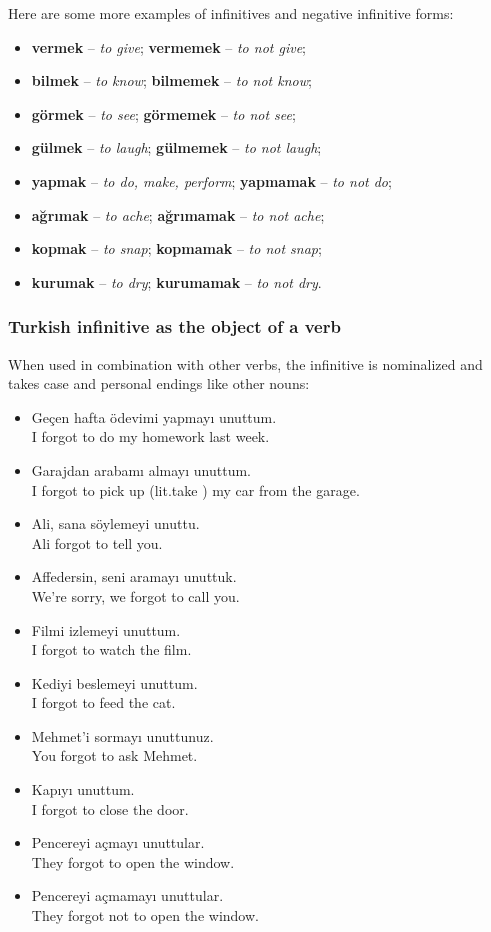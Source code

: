 Here are some more examples of infinitives and negative infinitive forms:
\begin{itemize}
\item \textbf{vermek} -- \emph{to give}; \textbf{vermemek} -- \emph{to not
    give};
\item \textbf{bilmek} -- \emph{to know}; \textbf{bilmemek} -- \emph{to not
    know};
\item \textbf{görmek} -- \emph{to see}; \textbf{görmemek} -- \emph{to not
    see};
\item \textbf{gülmek} -- \emph{to laugh}; \textbf{gülmemek} -- \emph{to not
    laugh};
\item \textbf{yapmak} -- \emph{to do, make, perform}; \textbf{yapmamak} --
  \emph{to not do};
\item \textbf{ağrımak} -- \emph{to ache}; \textbf{ağrımamak} -- \emph{to
    not ache};
\item \textbf{kopmak} -- \emph{to snap}; \textbf{kopmamak} -- \emph{to not
    snap};
\item \textbf{kurumak} -- \emph{to dry}; \textbf{kurumamak} -- \emph{to not
  dry}.
\end{itemize}

\subsubsection{Turkish infinitive as the object of a verb}
When used in combination with other verbs, the infinitive is nominalized
and takes case and personal endings like other nouns:

\begin{itemize}
\item Geçen hafta ödevimi yapmayı unuttum.\\
  I forgot to do my homework last week.
\item Garajdan arabamı almayı unuttum.\\
  I forgot to pick up (lit.\@ take ) my car from the garage.
\item Ali, sana söylemeyi unuttu.\\
  Ali forgot to tell you.
\item Affedersin, seni aramayı unuttuk.\\
  We're sorry, we forgot to call you.
\item Filmi izlemeyi unuttum.\\
  I forgot to watch the film.
\item Kediyi beslemeyi unuttum.\\
  I forgot to feed the cat.
\item Mehmet'i sormayı unuttunuz.\\
  You forgot to ask Mehmet.
\item Kapıyı unuttum.\\
  I forgot to close the door.
\item Pencereyi açmayı unuttular.\\
  They forgot to open the window.
\item Pencereyi açmamayı unuttular.\\
  They forgot not to open the window.
\end{itemize}

